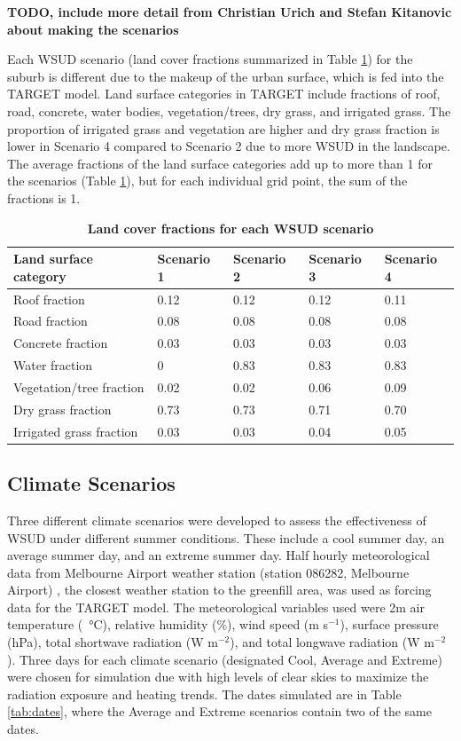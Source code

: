\documentclass[final,3p,times,authoryear]{elsarticle}
\begin{document}
\textbf{TODO, include more detail from Christian Urich and Stefan Kitanovic about making the scenarios }

Each WSUD scenario (land cover fractions summarized in Table \ref{tab:parameters}) for the suburb is different due to the makeup of the urban surface, which is fed into the TARGET model. Land surface categories in TARGET include fractions of roof, road, concrete, water bodies, vegetation/trees, dry grass, and irrigated grass. The proportion of irrigated grass and vegetation are higher and dry grass fraction is lower in Scenario 4 compared to Scenario 2 due to more WSUD in the landscape. The average fractions of the land surface categories add up to more than 1 for the scenarios (Table \ref{tab:parameters}), but for each individual grid point, the sum of the fractions is 1.


\begin{table}[!htbp]
\caption{\bf Land cover fractions for each WSUD scenario  \label{tab:parameters}}     
\begin{tabular}{ l l l l l}
\textbf{Land surface category} & \textbf{Scenario 1} & \textbf{Scenario 2}  & \textbf{Scenario 3} & \textbf{Scenario 4}\\ \hline
Roof fraction & 0.12 & 0.12 & 0.12 & 0.11 \\ 
Road fraction & 0.08 & 0.08 & 0.08 & 0.08 \\ 
Concrete fraction & 0.03 & 0.03 & 0.03 & 0.03 \\ 
Water fraction & 0 & 0.83 & 0.83 & 0.83 \\ 
Vegetation/tree fraction & 0.02 & 0.02 & 0.06 & 0.09 \\ 
Dry grass fraction & 0.73 & 0.73 & 0.71 & 0.70 \\ 
Irrigated grass fraction & 0.03 & 0.03 & 0.04 & 0.05 \\ 
\hline
\end{tabular}
\end{table}


\subsection{Climate Scenarios}\label{sec:methods_climate_scenarios}

Three different climate scenarios were developed to assess the effectiveness of WSUD under different summer conditions. These include a cool summer day, an average summer day, and an extreme summer day. Half hourly meteorological data from Melbourne Airport weather station (station 086282, Melbourne Airport) \citep{BOM2016b}, the closest weather station to the greenfill area, was used as forcing data for the TARGET model. The meteorological variables used were 2m air temperature (\SI{}{\degreeCelsius}), relative humidity (\%), wind speed (m s$^{-1}$), surface pressure (hPa), total shortwave radiation (W m$^{-2}$), and total longwave radiation (W m$^{-2}$). Three days for each climate scenario (designated Cool, Average and Extreme) were chosen for simulation due with high levels of clear skies to maximize the radiation exposure and heating trends. The dates simulated are in Table \ref{tab:dates}, where the Average and Extreme scenarios contain two of the same dates.
\end{document}
